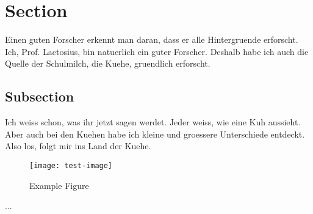 \section{Section}
\setcounter{page}{1}

Einen guten Forscher erkennt man daran, dass er alle Hintergruende erforscht.
Ich, Prof. Lactosius, bin natuerlich ein guter Forscher. Deshalb habe ich auch
die Quelle der Schulmilch, die Kuehe, gruendlich erforscht.

\subsection{Subsection}

Ich weiss schon, was ihr jetzt sagen werdet. Jeder weiss, wie eine Kuh aussieht.
Aber auch bei den Kuehen habe ich kleine und groessere Unterschiede entdeckt.
Also los, folgt mir ins Land der Kuehe. 

\begin{figure}[h]
   \begin{center}
   \caption{Example Figure}\label{fig:example-figure}\smallskip
   \texttt{[image: test-image]}
\end{center}
\end{figure}


...



